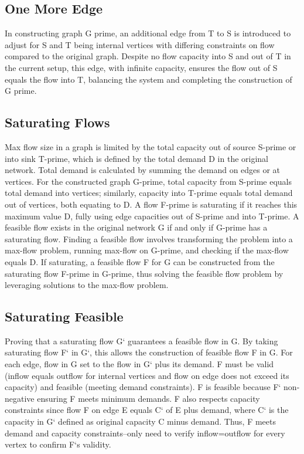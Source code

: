 \subsection*{One More Edge}
In constructing graph G prime, an additional edge from T to S is introduced to adjust for S and T being internal vertices with differing constraints on flow compared to the original graph.
Despite no flow capacity into S and out of T in the current setup, this edge, with infinite capacity, ensures the flow out of S equals the flow into T, balancing the system and completing the construction of G prime.

\subsection*{Saturating Flows}
Max flow size in a graph is limited by the total capacity out of source S-prime or into sink T-prime, which is defined by the total demand D in the original network.
Total demand is calculated by summing the demand on edges or at vertices.
For the constructed graph G-prime, total capacity from S-prime equals total demand into vertices; similarly, capacity into T-prime equals total demand out of vertices, both equating to D\@.
A flow F-prime is saturating if it reaches this maximum value D, fully using edge capacities out of S-prime and into T-prime.
A feasible flow exists in the original network G if and only if G-prime has a saturating flow.
Finding a feasible flow involves transforming the problem into a max-flow problem, running max-flow on G-prime, and checking if the max-flow equals D\@.
If saturating, a feasible flow F for G can be constructed from the saturating flow F-prime in G-prime, thus solving the feasible flow problem by leveraging solutions to the max-flow problem.

\subsection*{Saturating Feasible}
Proving that a saturating flow G` guarantees a feasible flow in G\@.
By taking saturating flow F` in G`, this allows the construction of feasible flow F in G\@.
For each edge, flow in G set to the flow in G` plus its demand.
F must be valid (inflow equals outflow for internal vertices and flow on edge does not exceed its capacity) and feasible (meeting demand constraints).
F is feasible because F` non-negative ensuring F meets minimum demands.
F also respects capacity constraints since flow F on edge E equals C` of E plus demand, where C` is the capacity in G` defined as original capacity C minus demand.
Thus, F meets demand and capacity constraints--only need to verify inflow=outflow for every vertex to confirm F`s validity.

